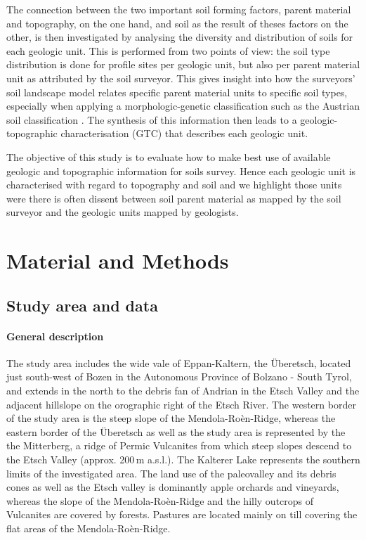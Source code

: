 \documentclass[preprint,12pt,authoryear]{elsarticle}
\begin{document}
The connection between the two important soil forming factors, parent material and topography, on the one hand, and soil as the result of theses factors on the other, is then investigated by analysing the diversity and distribution of soils for each geologic unit. This is performed from two points of view: the soil type distribution is done for profile sites per geologic unit, but also per parent material unit as attributed by the soil surveyor. This gives insight into how the surveyors' soil landscape model relates specific parent material units to specific soil types, especially when applying a morphologic-genetic classification such as the Austrian soil classification \citep{Nestroy2011}. The synthesis of this information then leads to a geologic-topographic characterisation (GTC) that describes each geologic unit. 

The objective of this study is to evaluate how to make best use of available geologic and topographic information for soils survey. Hence each geologic unit is characterised with regard to topography and soil and we highlight those units were there is often dissent between soil parent material as mapped by the soil surveyor and the geologic units mapped by geologists.



\section{Material and Methods}
\subsection{Study area and data}
\paragraph{General description}
The study area includes the wide vale of Eppan-Kaltern, the {\"U}beretsch, located just south-west of Bozen in the Autonomous Province of Bolzano - South Tyrol, and extends in the north to the debris fan of Andrian in the Etsch Valley and the adjacent hillslope on the orographic right of the Etsch River. The western border of the study area is the steep slope of the Mendola-Ro\`en-Ridge, whereas the eastern border of the {\"U}beretsch as well as the study area is represented by the the Mitterberg, a ridge of Permic Vulcanites from which steep slopes descend to the Etsch Valley (approx. 200\,m a.s.l.). The Kalterer Lake represents the southern limits of the investigated area. The land use of the paleovalley and its debris cones as well as the Etsch valley is dominantly apple orchards and vineyards, whereas the slope of the  Mendola-Ro\`en-Ridge and the hilly outcrops of Vulcanites are covered by forests. Pastures are located mainly on till covering the flat areas of the  Mendola-Ro\`en-Ridge. 
\end{document}
